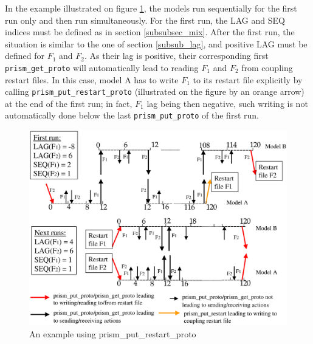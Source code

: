 In the example illustrated on figure \ref{restart_ex}, the models
run sequentially for the first run only and then run
simultaneously. For the first run, the LAG and SEQ indices must be
defined as in section \ref{subsubsec_mix}.  After the first run, the
situation is similar to the one of section \ref{subsub_lag}, and
positive LAG must be defined for $F_1$ and $F_2$. As their lag is
positive, their corresponding first {\tt prism\_get\_proto} will
automatically lead to reading $F_1$ and $F_2$ from coupling restart
files.  In this case, model A has to write $F_1$ to its restart file
explicitly by calling {\tt prism\_put\_restart\_proto} (illustrated
on the figure by an orange arrow) at the end of the first run; in
fact, $F_1$ lag being then negative, such writing is not automatically
done below the last {\tt prism\_put\_proto} of the first run.


\begin{figure}
\includegraphics[scale=.6]{restart_example.eps} 
\caption{An example using prism\_put\_restart\_proto}
\label{restart_ex}
\end{figure} 

